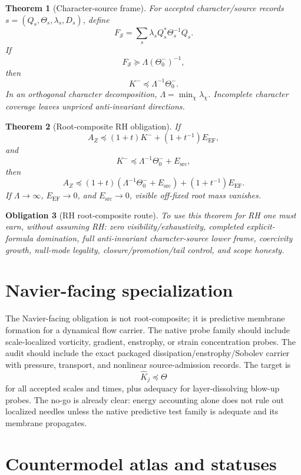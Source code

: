 \documentclass[11pt]{article}
\newtheorem{theorem}{Theorem}[section]
\newtheorem{obligation}[theorem]{Obligation}
\newcommand{\EF}{\mathrm{EF}}
\newcommand{\src}{\mathrm{src}}
\begin{document}
\begin{theorem}[Character-source frame]
For accepted character/source records \(s=(Q_s,\Theta_s,\lambda_s,D_s)\), define
\[
  F_{\mathcal S}=\sum_s\lambda_s Q_s^*\Theta_s^{-1}Q_s.
\]
If
\[
  F_{\mathcal S}\succeq \Lambda(\Theta_0^-)^{-1},
\]
then
\[
  K^-\preceq\Lambda^{-1}\Theta_0^-.
\]
In an orthogonal character decomposition, \(\Lambda=\min_\chi\lambda_\chi\).  Incomplete character coverage leaves unpriced anti-invariant directions.
\end{theorem}

\begin{theorem}[Root-composite RH obligation]
If
\[
  A_Z\preceq(1+t)K^-+(1+t^{-1})E_{\EF},
\]
and
\[
  K^-\preceq\Lambda^{-1}\Theta_0^-+E_{\src},
\]
then
\[
  A_Z\preceq(1+t)(\Lambda^{-1}\Theta_0^-+E_{\src})+(1+t^{-1})E_{\EF}.
\]
If \(\Lambda\to\infty\), \(E_{\EF}\to0\), and \(E_{\src}\to0\), visible off-fixed root mass vanishes.
\end{theorem}

\begin{obligation}[RH root-composite route]
To use this theorem for RH one must earn, without assuming RH: zero visibility/exhaustivity, completed explicit-formula domination, full anti-invariant character-source lower frame, coercivity growth, null-mode legality, closure/promotion/tail control, and scope honesty.
\end{obligation}

\section{Navier-facing specialization}

The Navier-facing obligation is not root-composite; it is predictive membrane formation for a dynamical flow carrier.  The native probe family should include scale-localized vorticity, gradient, enstrophy, or strain concentration probes.  The audit should include the exact packaged dissipation/enstrophy/Sobolev carrier with pressure, transport, and nonlinear source-admission records.  The target is
\[
  \widehat K_j\preceq\Theta
\]
for all accepted scales and times, plus adequacy for layer-dissolving blow-up probes.  The no-go is already clear: energy accounting alone does not rule out localized needles unless the native predictive test family is adequate and its membrane propagates.

\section{Countermodel atlas and statuses}
\end{document}
